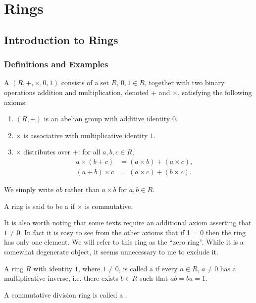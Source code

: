 \chapter{Rings}\label{chap:rings}
\section{Introduction to Rings}
\subsection{Definitions and Examples}
\begin{definition}[Ring]
A  $(R,+,\times,0,1)$ consists of a set $R$, $0,1\in R$, together with two binary operations addition and multiplication, denoted $+$ and $\times$, satisfying the following axioms:
\begin{enumerate}[label=(\roman*)]
\item $(R,+)$ is an abelian group with additive identity $0$.
\item $\times$ is associative with multiplicative identity $1$.
\item $\times$ distributes over $+$: for all $a,b,c\in R$,
\begin{align*}
a\times(b+c)&=(a\times b)+(a\times c),\\
(a+b)\times c&=(a\times c)+(b\times c).
\end{align*}
\end{enumerate}
\end{definition}

\begin{notation}
We simply write $ab$ rather than $a\times b$ for $a,b\in R$.
\end{notation}

A ring is said to be a  if $\times$ is commutative.

\begin{remark}
It is also worth noting that some texts require an additional axiom asserting that $1\neq0$. In fact it is easy to see from the other axioms that if 1 = 0 then the ring has only one element. We will refer to this ring as the ``zero ring''. While it is a somewhat degenerate object, it seems unnecessary to me to exclude it.
\end{remark}

\begin{definition}
A ring $R$ with identity $1$, where $1\neq0$, is called a  if every $a\in R$, $a\neq0$ has a multiplicative inverse, i.e. there exists $b\in R$ such that $ab=ba=1$.

A commutative division ring is called a .
\end{definition}

